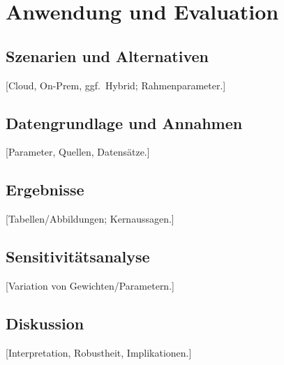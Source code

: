 \chapter{Anwendung und Evaluation}

\section{Szenarien und Alternativen}
[Cloud, On-Prem, ggf.\ Hybrid; Rahmenparameter.]

\section{Datengrundlage und Annahmen}
[Parameter, Quellen, Datensätze.]

\section{Ergebnisse}
[Tabellen/Abbildungen; Kernaussagen.]

\section{Sensitivitätsanalyse}
[Variation von Gewichten/Parametern.]

\section{Diskussion}
[Interpretation, Robustheit, Implikationen.]
